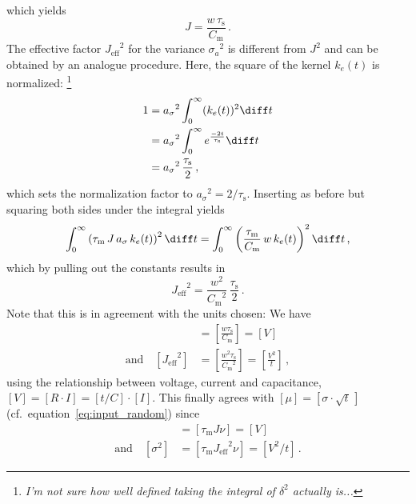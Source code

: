 which yields 
\begin{equation}
    J = \frac{w \, \tau_\text{s}}{C_\text{m}} \,.
    \label{eq:J_eff}
\end{equation}
The effective factor ${J_\text{eff}}^2 $ for the variance ${\sigma_a}^2$ is different 
from $J^2$ and can be 
obtained by an analogue procedure. Here, the square of the kernel $k_e(t)$ is normalized:%
\footnote{
\emph{I'm not sure how well defined taking the integral of $\delta^2$ actually is...}}
\begin{equation}
    \begin{split}
        1   &= {a_\sigma}^2 \int_{0}^{\infty}(k_e(t))^2\diff t  \\
            &= {a_\sigma}^2 \int_{0}^{\infty} e^{\frac{-2t}{\tau_\text{s} }} \diff t  \\
            &= {a_\sigma}^2 \, \frac{\tau_\text{s} }{2}\,,
    \end{split}
    \label{eq:match_k_e_sq}
\end{equation}
which sets the normalization factor to ${a_\sigma}^2 = 2 / \tau_\text{s} $.
Inserting as before but squaring both sides under the integral yields
\begin{equation}
    \int_{0}^{\infty} \left(\tau_\text{m} \,J \,a_\sigma\, k_e(t)\right)^2 \diff t 
        = \int_{0}^{\infty} \left(\frac{\tau_\text{m} }{C_\text{m}} \,w\, k_e(t)\right)^2\diff t \,,
    \label{eq:match_syns}
\end{equation}
which by pulling out the constants results in 
\begin{equation}
    {J_\text{eff}}^2 =  \frac{w^2}{{C_\text{m}}^2} \,\frac{\tau_\text{s} }{2}  \, .
    \label{eq:J_eff}
\end{equation}
Note that this is in agreement with the units chosen: We have
\begin{align}
    [J] 
        &=  \left[ \frac{w \tau_\text{s} }{C_\text{m}}\right] 
        = [V] \\
    \text{and}\quad 
    \left[ {J_\text{eff}}^2  \right] 
        &=  \left[ \frac{w^2 \tau_\text{s}}{{C_\text{m}}^2} \right] 
    = \left[ \frac{V^2}{t} \right] \,,
    \label{eq:units}
\end{align}
using the relationship between voltage, current and capacitance, $[V] = [R\cdot I] = [t / C]\cdot[I]$.
This finally agrees with $[\mu] = [\sigma \cdot \sqrt{t}\,]$ (cf.~equation~\eqref{eq:input_random}) since
\begin{align}   
    [\mu] &= [\tau_\text{m} J \nu] = [V] \\
    \text{and}\quad 
    [\sigma^2] &= [\tau_\text{m} {J_\text{eff}}^2  \nu] = [V^2 / t]  \,.
    \label{eq:units}
\end{align}

